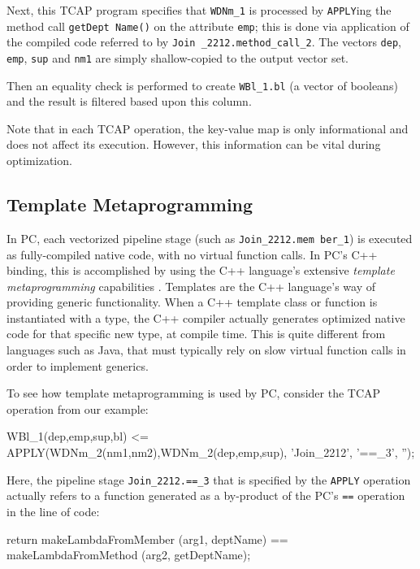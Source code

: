 Next, this TCAP program
specifies that \texttt{WDNm\_1} is processed by \texttt{APPLY}ing the
method call \texttt{getDept Name()} on the attribute \texttt{emp}; this is 
done via application of the compiled code referred to by \texttt{Join
  \_2212.method\_call\_2}.  
The vectors \texttt{dep}, \texttt{emp}, \texttt{sup}
and \texttt{nm1} are simply shallow-copied to the output vector set.

Then an equality check is performed to create \texttt{WBl\_1.bl}
(a vector of booleans) and the result is filtered based upon this
column.


Note that in each TCAP operation, the key-value map is only
informational and does not affect its execution.  However, this
information can be vital during optimization.  

\subsection{Template Metaprogramming}

In PC,
each vectorized pipeline stage (such as \texttt{Join\_2212.mem ber\_1}) is executed as fully-compiled native code, with no virtual function
calls.
In PC's C++ binding, this is accomplished by using the C++ language's extensive \emph{template metaprogramming} 
capabilities \cite{josuttis2012c++}.  Templates are the C++ language's way of providing generic functionality.
When a C++ template class or
function is instantiated with a type, %
the C++ compiler actually generates optimized native code for that specific new type, at compile time.  
This is quite different from languages
such as Java, that must typically rely on slow virtual
function calls in order to implement generics.

To see how template metaprogramming is used by PC, consider
the TCAP operation from our example:

\begin{codesmall}
WBl_1(dep,emp,sup,bl) <= 
   APPLY(WDNm_2(nm1,nm2),WDNm_2(dep,emp,sup), 
      'Join_2212', '==_3', '');
\end{codesmall}

\noindent
Here, the pipeline stage \texttt{Join\_2212.==\_3} that is specified by the \texttt{APPLY} operation
actually refers to a function generated as a by-product of the
PC's \texttt{==} operation
in the line of code:

\begin{codesmall} 
return makeLambdaFromMember (arg1, deptName) == 
    makeLambdaFromMethod (arg2, getDeptName); 
\end{codesmall}


